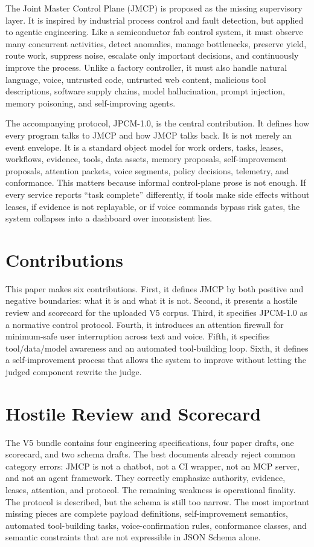 \documentclass[journal,onecolumn]{IEEEtran}
\begin{document}
The Joint Master Control Plane (JMCP) is proposed as the missing supervisory layer. It is inspired by industrial process control and fault detection, but applied to agentic engineering. Like a semiconductor fab control system, it must observe many concurrent activities, detect anomalies, manage bottlenecks, preserve yield, route work, suppress noise, escalate only important decisions, and continuously improve the process. Unlike a factory controller, it must also handle natural language, voice, untrusted code, untrusted web content, malicious tool descriptions, software supply chains, model hallucination, prompt injection, memory poisoning, and self-improving agents.

The accompanying protocol, JPCM-1.0, is the central contribution. It defines how every program talks to JMCP and how JMCP talks back. It is not merely an event envelope. It is a standard object model for work orders, tasks, leases, workflows, evidence, tools, data assets, memory proposals, self-improvement proposals, attention packets, voice segments, policy decisions, telemetry, and conformance. This matters because informal control-plane prose is not enough. If every service reports ``task complete'' differently, if tools make side effects without leases, if evidence is not replayable, or if voice commands bypass risk gates, the system collapses into a dashboard over inconsistent lies.

\section{Contributions}
This paper makes six contributions. First, it defines JMCP by both positive and negative boundaries: what it is and what it is not. Second, it presents a hostile review and scorecard for the uploaded V5 corpus. Third, it specifies JPCM-1.0 as a normative control protocol. Fourth, it introduces an attention firewall for minimum-safe user interruption across text and voice. Fifth, it specifies tool/data/model awareness and an automated tool-building loop. Sixth, it defines a self-improvement process that allows the system to improve without letting the judged component rewrite the judge.

\section{Hostile Review and Scorecard}
The V5 bundle contains four engineering specifications, four paper drafts, one scorecard, and two schema drafts. The best documents already reject common category errors: JMCP is not a chatbot, not a CI wrapper, not an MCP server, and not an agent framework. They correctly emphasize authority, evidence, leases, attention, and protocol. The remaining weakness is operational finality. The protocol is described, but the schema is still too narrow. The most important missing pieces are complete payload definitions, self-improvement semantics, automated tool-building tasks, voice-confirmation rules, conformance classes, and semantic constraints that are not expressible in JSON Schema alone.
\end{document}
